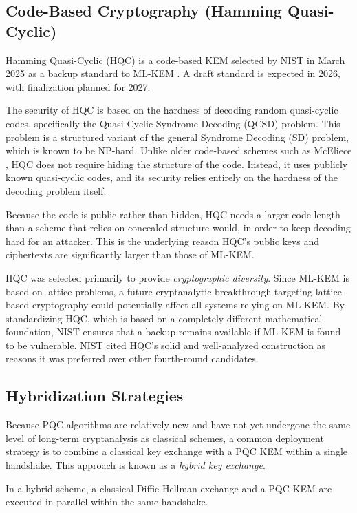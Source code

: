 \subsection{Code-Based Cryptography (Hamming Quasi-Cyclic)}\label{sec:hqc}
Hamming Quasi-Cyclic (HQC) \cite{hqc} is a code-based KEM selected by NIST in March 2025 as a backup standard to ML-KEM \cite{Moody2025NISTIR8545}. A draft standard is expected in 2026, with finalization planned for 2027.

The security of HQC is based on the hardness of decoding random quasi-cyclic codes, specifically the Quasi-Cyclic Syndrome Decoding (QCSD) problem. This problem is a structured variant of the general Syndrome Decoding (SD) problem, which is known to be NP-hard. Unlike older code-based schemes such as McEliece \cite{McEliece1978}, HQC does not require hiding the structure of the code. Instead, it uses publicly known quasi-cyclic codes, and its security relies entirely on the hardness of the decoding problem itself.

Because the code is public rather than hidden, HQC needs a larger code length than a scheme that relies on concealed structure would, in order to keep decoding hard for an attacker. This is the underlying reason HQC's public keys and ciphertexts are significantly larger than those of ML-KEM.

HQC was selected primarily to provide \textit{cryptographic diversity}. Since ML-KEM is based on lattice problems, a future cryptanalytic breakthrough targeting lattice-based cryptography could potentially affect all systems relying on ML-KEM. By standardizing HQC, which is based on a completely different mathematical foundation, NIST ensures that a backup remains available if ML-KEM is found to be vulnerable. NIST cited HQC's solid and well-analyzed construction as reasons it was preferred over other fourth-round candidates.

\subsection{Hybridization Strategies}
Because PQC algorithms are relatively new and have not yet undergone the same level of long-term cryptanalysis as classical schemes, a common deployment strategy is to combine a classical key exchange with a PQC KEM within a single handshake. This approach is known as a \textit{hybrid key exchange}.

In a hybrid scheme, a classical Diffie-Hellman exchange and a PQC KEM are executed in parallel within the same handshake. 

